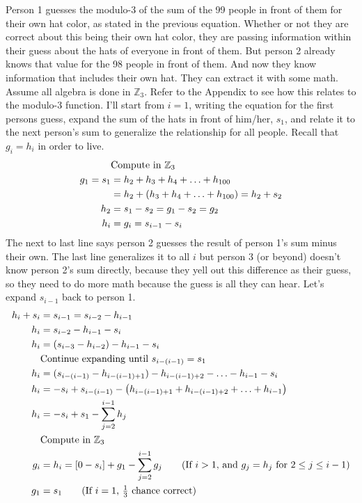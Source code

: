 \documentclass[10pt]{article}
\begin{document}
Person 1 guesses the modulo-3 of the sum of the 99 people in front of them 
for their own hat color, as stated in the previous equation. 
Whether or not they are correct about this being their own hat color, 
they are passing information within their guess about the hats of everyone in 
front of them. But person 2 already knows that value for the 98 people in 
front of them. And now they know information that includes their own hat. They 
can extract it with some math. Assume all algebra is done in $\mathbb{Z}_3$. 
Refer to the Appendix to see how this relates to the modulo-3 function. I'll 
start from $i=1$, writing the equation for the first persons guess, expand 
the sum of the hats in front of him/her, $s_1$, and relate it to the next 
person's sum to generalize the relationship for all people. Recall that 
$g_i=h_i$ in order to live.
\begin{align}
    &\text{Compute in $\mathbb{Z}_3$} \notag \\
    g_1 = s_1 &= h_2+h_3+h_4+\ldots+h_{100} \notag\\
    &= h_2+(h_3+h_4+\ldots+h_{100}) = h_2+s_2 \notag\\
    h_2 &= s_1 - s_2 = g_1 - s_2 = g_2 \notag \\
    h_i &= g_i = s_{i-1} - s_i \notag 
\end{align}
The next to last line says person 2 guesses the result of person 1's 
sum minus their own. The last line generalizes it to all $i$ but 
person 3 (or beyond) doesn't know person 2's sum directly, because 
they yell out this difference as their guess, so they need to do more math 
because the guess is all they can hear. Let's expand $s_{i-1}$ back to person 1.
\begin{align}
    h_i + s_i &= s_{i-1} = s_{i-2} - h_{i-1} \notag \\
    h_i &=s_{i-2} - h_{i-1}-s_i \notag \\
    h_i &= (s_{i-3} - h_{i-2}) - h_{i-1}-s_i \notag \\
    &\text{Continue expanding until $s_{i-(i-1)}=s_1$} \notag \\
    h_i &= (s_{i-(i-1)}-h_{i-(i-1)+1}) - h_{i-(i-1)+2} - \ldots - h_{i-1}-s_i 
        \notag \\
    h_i &= -s_i+ s_{i-(i-1)}-\left(h_{i-(i-1)+1}+h_{i-(i-1)+2}+\ldots+h_{i-1}
        \right) \notag \\
    h_i &= -s_i + s_1 - \sum_{j=2}^{i-1}h_j \notag \\
    &\text{Compute in $\mathbb{Z}_3$} \notag \\
    g_i &= h_i = [0-s_i] + g_1 - \sum_{j=2}^{i-1}g_j \tag{If $i>1$, 
        and $g_j=h_j$ for $2\leq j\leq i-1$} \\
    g_1 &= s_1  \tag{If $i=1$, $\tfrac{1}{3}$ chance correct}
\end{align}
\end{document}

